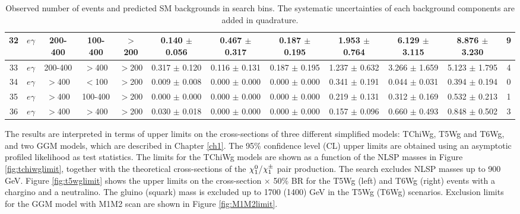 \documentclass[thesis.tex]{subfiles}
\renewcommand\_{\textunderscore\allowbreak}
\begin{document}
\begin{table}[hbtp]
{\begin{tabular}{|c|c|c|c|c|c|c|c|c|c||c|c|}
 32&  $e\gamma$     & 200-400 & 100-400 & $>$200  &     0.140 $\pm$ 0.056  &   0.467 $\pm$ 0.317 &   0.187 $\pm$ 0.195  &   1.953 $\pm$  0.764 &   6.129 $\pm$  3.115 &   8.876 $\pm$   3.230  &   9\\ \hline
 33&  $e\gamma$     & 200-400 & $>$400  & $>$200  &     0.317 $\pm$ 0.120  &   0.116 $\pm$ 0.131 &   0.187 $\pm$ 0.195  &   1.237 $\pm$  0.632 &   3.266 $\pm$  1.659 &   5.123 $\pm$   1.795  &   4\\ \hline
 34&  $e\gamma$     & $>$400 & $<$100   & $>$200  &     0.009 $\pm$ 0.008  &   0.000 $\pm$ 0.000 &   0.000 $\pm$ 0.000  &   0.341 $\pm$  0.191 &   0.044 $\pm$  0.031 &   0.394 $\pm$   0.194  &   0\\ \hline
 35&  $e\gamma$     & $>$400 & 100-400  & $>$200  &     0.000 $\pm$ 0.000  &   0.000 $\pm$ 0.000 &   0.000 $\pm$ 0.000  &   0.219 $\pm$  0.131 &   0.312 $\pm$  0.169 &   0.532 $\pm$   0.213  &   1\\ \hline
 36&  $e\gamma$     & $>$400 & $>$400   & $>$200  &     0.030 $\pm$ 0.018  &   0.000 $\pm$ 0.000 &   0.000 $\pm$ 0.000  &   0.157 $\pm$  0.096 &   0.660 $\pm$  0.493 &   0.848 $\pm$   0.502  &   3\\ \hline
 \end{tabular}
 }
 \caption{Observed number of events and predicted SM backgrounds in search bins. The systematic uncertainties of each background components are added in quadrature.}
 \label{tab:unblindeddata}
 \end{table}    


The results are interpreted in terms of upper limits on the cross-sections of three different simplified models: TChiWg, T5Wg and T6Wg, and two GGM models, which are described in Chapter \ref{ch1}. The 95\% confidence level (CL) upper limits are obtained using an asymptotic profiled likelihood as test statistics. The limits for the TChiWg models are shown as a function of the NLSP masses in Figure \ref{fig:tchiwglimit}, together with the theoretical cross-sections of the $\chi_1^0$/$\chi_1^\pm$ pair production. The search excludes NLSP masses up to 900 GeV. Figure \ref{fig:t5wglimit} shows the upper limits on the cross-section $\times$ 50\% BR for the T5Wg (left) and T6Wg (right) events with a chargino and a neutralino. The gluino (squark) mass is excluded up to 1700 (1400) GeV in the T5Wg (T6Wg) scenarios. Exclusion limits for the GGM model with M1M2 scan are shown in Figure \ref{fig:M1M2limit}. 
\end{document}
